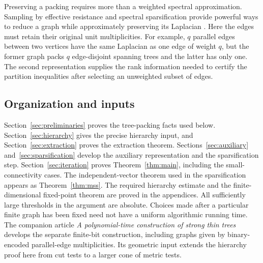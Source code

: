 Preserving a packing requires more than a weighted spectral
approximation. Sampling by effective resistance and spectral
sparsification provide powerful ways to reduce a graph while
approximately preserving its Laplacian
\cite{SpielmanSrivastava2011,BatsonSpielmanSrivastava2012}.
Here the edges must retain their original unit multiplicities.
For example, \(q\) parallel edges between two vertices have the same
Laplacian as one edge of weight \(q\), but the former graph packs
\(q\) edge-disjoint spanning trees and the latter has only one.
The second representation supplies the rank information needed to
certify the partition inequalities after selecting an unweighted
subset of edges.

\subsection*{Organization and inputs}

Section~\ref{sec:preliminaries} proves the tree-packing facts used below.
Section~\ref{sec:hierarchy} gives the precise hierarchy input, and
Section~\ref{sec:extraction} proves the extraction theorem.
Sections~\ref{sec:auxiliary} and~\ref{sec:sparsification} develop the
auxiliary representation and the sparsification step.
Section~\ref{sec:iteration} proves Theorem~\ref{thm:main}, including
the small-connectivity cases.
The independent-vector theorem used in the sparsification appears
as Theorem~\ref{thm:mss}. The required hierarchy estimate and the
finite-dimensional fixed-point theorem are proved in the appendices.
All sufficiently large thresholds in the argument are absolute.
Choices made after a particular finite graph has been fixed need
not have a uniform algorithmic running time.
The companion article \emph{A polynomial-time construction of strong
thin trees}~\cite{ConstructiveThinTreesCompanion} develops the
separate finite-bit construction, including graphs given by
binary-encoded parallel-edge multiplicities. Its geometric input
extends the hierarchy proof here from cut tests to a larger cone of
metric tests.
